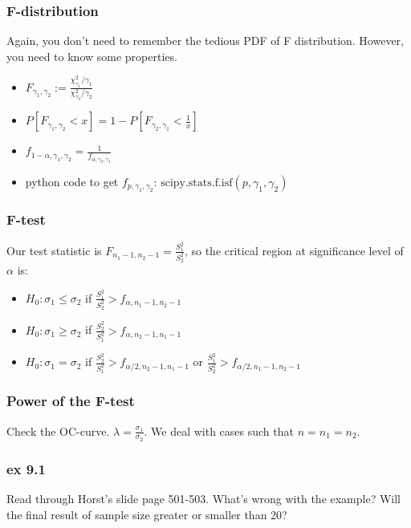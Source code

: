 \documentclass{beamer}
\begin{document}
\begin{frame}
    \frametitle{F-distribution}

    Again, you don't need to remember the tedious PDF of F distribution. However, you need to know some properties.
    \begin{itemize}
        \item $F_{\gamma_1, \gamma_2}:=\frac{\chi^2_{\gamma_1}/\gamma_1}{\chi^2_{\gamma_2}/\gamma_2}$
        \item $P[F_{\gamma_1, \gamma_2}<x]=1-P[F_{\gamma_2, \gamma_1}<\frac{1}{x}]$
        \item $f_{1-\alpha, \gamma_1, \gamma_2}=\frac{1}{f_{\alpha, \gamma_2, \gamma_1}}$
        \item python code to get $f_{p, \gamma_1, \gamma_2}$: $\text{scipy.stats.f.isf}(p, \gamma_1, \gamma_2)$
    \end{itemize}

\end{frame}

\begin{frame}
    \frametitle{F-test}

    Our test statistic is $F_{n_1-1, n_2-1}=\frac{S_1^2}{S_2^2}$, so the critical region at significance level of $\alpha$ is:
    \begin{itemize}
        \item $H_0: \sigma_1\leq \sigma_2$ if $\frac{S_1^2}{S_2^2}> f_{\alpha, n_1-1, n_2-1}$
        \item $H_0: \sigma_1\geq \sigma_2$ if $\frac{S_2^2}{S_1^2}> f_{\alpha, n_2-1, n_1-1}$
        \item $H_0: \sigma_1 = \sigma_2$ if $\frac{S_2^2}{S_1^2}> f_{\alpha/2, n_2-1, n_1-1}$ or $\frac{S_1^2}{S_2^2}> f_{\alpha/2, n_1-1, n_2-1}$
    \end{itemize}

\end{frame}

\begin{frame}
    \frametitle{Power of the F-test}

    Check the OC-curve. $\lambda=\frac{\sigma_1}{\sigma_2}$. We deal with cases such that $n=n_1=n_2$.

\end{frame}

\begin{frame}
    \frametitle{ex 9.1}

    Read through Horst's slide page 501-503. What's wrong with the example? Will the final result of sample size greater or smaller than 20?

\end{frame}
\end{document}
